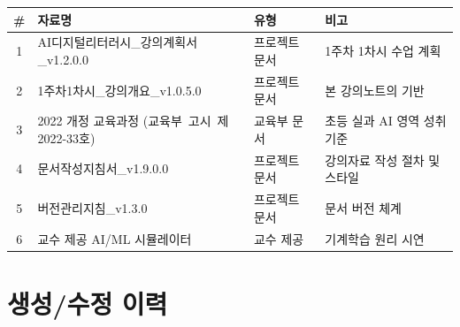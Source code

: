 \documentclass[11pt,a4paper]{article}
\begin{document}
\begin{center}
\begin{tabular}{|c|p{5.5cm}|p{2.5cm}|p{3.5cm}|}
\hline
\rowcolor{tableheader}
\textbf{\#} & \textbf{자료명} & \textbf{유형} & \textbf{비고} \\
\hline
1 & AI디지털리터러시\_강의계획서\_v1.2.0.0 & 프로젝트 문서 & 1주차 1차시 수업 계획 \\
\hline
2 & 1주차1차시\_강의개요\_v1.0.5.0 & 프로젝트 문서 & 본 강의노트의 기반 \\
\hline
3 & 2022 개정 교육과정 \mbox{(교육부 고시 제2022-33호)} & 교육부 문서 & 초등 실과 AI 영역 성취기준 \\
\hline
4 & 문서작성지침서\_v1.9.0.0 & 프로젝트 문서 & 강의자료 작성 절차 및 스타일 \\
\hline
5 & 버전관리지침\_v1.3.0 & 프로젝트 문서 & 문서 버전 체계 \\
\hline
6 & 교수 제공 AI/ML 시뮬레이터 & 교수 제공 & 기계학습 원리 시연 \\
\hline
\end{tabular}
\end{center}

\section*{생성/수정 이력}
\end{document}
